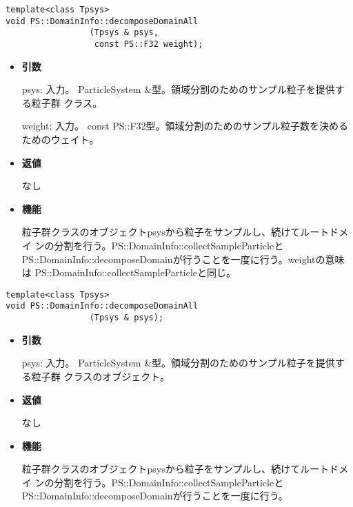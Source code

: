 
\begin{screen}
\begin{verbatim}
template<class Tpsys>
void PS::DomainInfo::decomposeDomainAll
                 (Tpsys & psys,
                  const PS::F32 weight);
\end{verbatim}
\end{screen}

\begin{itemize}

\item {\bf 引数}

psys: 入力。 ParticleSystem \&型。領域分割のためのサンプル粒子を提供する粒子群
クラス。

weight: 入力。 const PS::F32型。領域分割のためのサンプル粒子数を決める
ためのウェイト。

\item {\bf 返値}

なし

\item {\bf 機能}

粒子群クラスのオブジェクトpsysから粒子をサンプルし、続けてルートドメイ
ンの分割を行う。PS::DomainInfo::collectSampleParticleと
PS::DomainInfo::decomposeDomainが行うことを一度に行う。weightの意味は
PS::DomainInfo::collectSampleParticleと同じ。

\end{itemize}

\begin{screen}
\begin{verbatim}
template<class Tpsys>
void PS::DomainInfo::decomposeDomainAll
                 (Tpsys & psys);
\end{verbatim}
\end{screen}

\begin{itemize}

\item {\bf 引数}

psys: 入力。 ParticleSystem \&型。領域分割のためのサンプル粒子を提供する粒子群
クラスのオブジェクト。

\item {\bf 返値}

なし

\item {\bf 機能}

粒子群クラスのオブジェクトpsysから粒子をサンプルし、続けてルートドメイ
ンの分割を行う。PS::DomainInfo::collectSampleParticleと
PS::DomainInfo::decomposeDomainが行うことを一度に行う。

\end{itemize}



